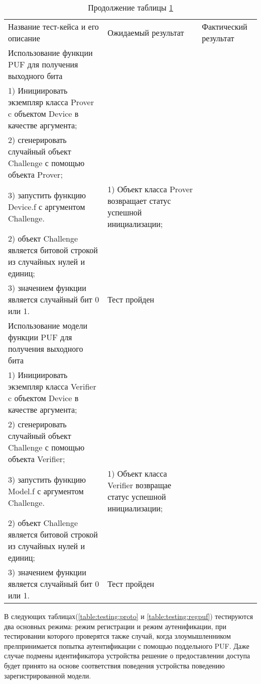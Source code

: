 \clearpage
\begin{longtable}[l]{| >{\raggedright}p{}
                     | >{\raggedright}p{}
                     | >{\raggedright\arraybackslash}p{}|}
  \caption{Тестирование взаимодействия с уcтройством}
  \label{table:testing:pufbit}\\
  \endfirsthead
  \caption*{Продолжение таблицы \ref{table:testing:pufbit}}\\
  \endhead

  \hline
       Название тест-кейса и его описание & Ожидаемый результат & Фактический результат \\
   \hline
   Использование функции PUF для получения выходного бита \\
   1) Инициировать экземпляр класса Prover c объектом Device в качестве аргумента; \\
   2) сгенерировать случайный объект Challenge с помощью объекта Prover; \\
   3) запустить функцию Device.f с аргументом Challenge.
   &
   1) Объект класса Prover возвращает статус успешной инициализации; \\
   2) объект Challenge является битовой строкой из случайных нулей и единиц; \\
   3) значением функции является случайный бит 0 или 1.
   &
   Тест пройден \\ \hline

   Использование модели функции PUF для получения выходного бита \\
   1) Инициировать экземпляр класса Verifier c объектом Device в качестве аргумента; \\
   2) сгенерировать случайный объект Challenge с помощью объекта Verifier; \\
   3) запустить функцию Model.f с аргументом Challenge.
   &
   1) Объект класса Verifier возвращае статус успешной инициализации; \\
   2) объект Challenge является битовой строкой из случайных нулей и единиц; \\
   3) значением функции является случайный бит 0 или 1.
   &
   Тест пройден \\ \hline

   \hline
\end{longtable}

\clearpage

В следующих таблицах(\ref{table:testing:proto} и \ref{table:testing:regpuf}) тестируются два основных режима: режим регистрации и режим аутенификации, при тестировании которого проверятся также случай, когда злоумышленником прелпринимается попытка аутентификации с помощью поддельного PUF. Даже случае подмены идентификатора устройства решение о предоставлении доступа будет принято на основе соответствия поведения устройства поведению зарегистрированной модели.


